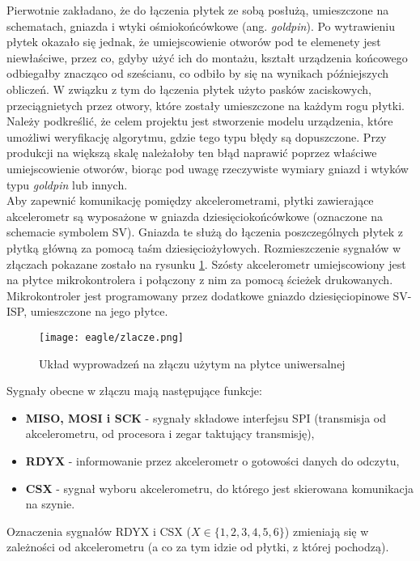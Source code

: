 Pierwotnie zakładano, że do łączenia płytek ze sobą posłużą, umieszczone na schematach, gniazda i wtyki ośmiokońcówkowe (ang. \textit{goldpin}). Po wytrawieniu płytek okazało się jednak, że umiejscowienie otworów pod te elemenety jest niewłaściwe, przez co, gdyby użyć ich do montażu, kształt urządzenia końcowego odbiegałby znacząco od sześcianu, co odbiło by się na wynikach późniejszych obliczeń. W związku z tym do łączenia płytek użyto pasków zaciskowych, przeciągnietych przez otwory, które zostały umieszczone na każdym rogu płytki. Należy podkreślić, że celem projektu jest stworzenie modelu urządzenia, które umożliwi weryfikację algorytmu, gdzie tego typu błędy są dopuszczone. Przy produkcji na większą skalę należałoby ten błąd naprawić poprzez właściwe umiejscowienie otworów, biorąc pod uwagę rzeczywiste wymiary gniazd i wtyków typu \textit{goldpin} lub innych.
$$ \, $$
Aby zapewnić komunikację pomiędzy akcelerometrami, płytki zawierające akcelerometr są wyposażone w gniazda dziesięciokońcówkowe (oznaczone na schemacie symbolem SV). Gniazda te służą do łączenia poszczególnych płytek z płytką główną za pomocą taśm dziesięciożyłowych. Rozmieszczenie sygnałów w złączach pokazane zostało na rysunku \ref{zlacze}. Szósty akcelerometr umiejscowiony jest na płytce mikrokontrolera i połączony z nim za pomocą ścieżek drukowanych.
Mikrokontroler jest programowany przez dodatkowe gniazdo dziesięciopinowe SV-ISP, umieszczone na jego płytce. 
\begin{figure}[H]
  \centering
\texttt{[image: eagle/zlacze.png]}
  \caption{Układ wyprowadzeń na złączu użytym na płytce uniwersalnej}
	\label{zlacze}

\end{figure}
Sygnały obecne w złączu mają następujące funkcje:
\begin{itemize}
\item \textbf{MISO, MOSI i SCK} - sygnały składowe interfejsu SPI (transmisja od akcelerometru, od procesora i zegar taktujący transmisję),
\item \textbf{RDYX} - informowanie przez akcelerometr o gotowości danych do odczytu,
\item \textbf{CSX} - sygnał wyboru akcelerometru, do którego jest skierowana komunikacja na szynie.
\end{itemize}
Oznaczenia sygnałów RDYX i CSX ($X\in \{1,2,3,4,5,6\}$) zmieniają się  w zależności od akcelerometru (a co za tym idzie od płytki, z której pochodzą).

